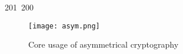 201~200~\documentclass{article}
\begin{document}
\begin{figure}[h]
	                                                                                                                                                                                                                                                                                                	                                                                                                                                        	    	                                                                                                	                                                                                                                                                                                                                                                                                                                                	                                                                        	                                                                        	                                                                                                                                        	                                                                                                                                        \texttt{[image: asym.png]}
	                                                                                                                                                                                                                                                                                                	                                                                                                                                        	    	                                                                                                	                                                                                                                                                                                                                                                                                                                                	                                                                        	                                                                        	                                                                                                                                        	                                                                                                                                            \caption{Core usage of asymmetrical cryptography}

\end{figure}
\end{document}
